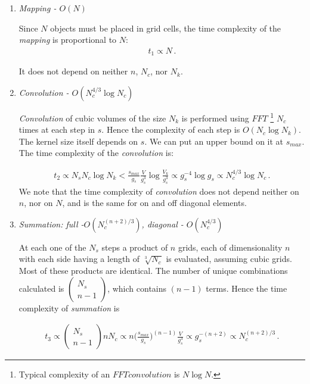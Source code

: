\documentclass{aa}
\begin{document}
\begin{enumerate}
\item \textit { Mapping - $O(N)$}

Since $N$ objects must be placed in grid cells, the time complexity of the \textit { mapping} is proportional to $N$:
\begin{align}
t_1 \propto N\, .
\label{eq:t1}
\end{align}

It does not depend on neither $n$, $N_c$, nor $N_k$. 

\item \textit { Convolution - $O(N_c^{4/3} \log N_c)$} 

\textit { Convolution} of cubic volumes of the size $N_k$ is performed  using $FFT$ \footnote{Typical complexity of an $FFT convolution$ is $N\log N$.} $N_c$ times at each step in $s$. Hence the complexity of each step is $O(N_c\log N_k)$.  The kernel size itself depends on $s$. We can put an upper bound on it at $s_{max}$. The time complexity of the \textit{convolution} is:

\begin{align}
t_2 \propto N_s N_c \log N_{k} < \frac{s_{max}}{g_s} \frac{V}{g_s^3} \log \frac{V_k}{g_s^3} \propto g_s^{-4} \log g_s \propto N_c^{4/3} \log N_c\, .
\label{eq:t2}
\end{align}
%
We note that the time complexity of \textit{ convolution} does not depend neither on $n$, nor on $N$, and is the same for on and off diagonal elements. 
\item \textit { Summation: full -$O(N_c^{(n+2)/3} )$,  diagonal - $O(N_c^{4/3})$}

At each one of the $N_s$ steps a product of $n$ grids, each of dimensionality $n$ with each side having a length of $\sqrt[3]{N_c}$ is evaluated, assuming cubic grids. Most of these products are identical.  The number of unique combinations calculated is $\begin{pmatrix}N_s \\ n-1 \end {pmatrix}$, which contains $(n-1)$ terms. Hence the time complexity of \textit { summation} is

\begin{align}
t_3 \propto \begin{pmatrix}N_s \\ n-1 \end {pmatrix} n N_c \propto n \big(\frac{s_{max}}{g_s}\big)^{(n-1)} \frac{V}{g_s^3}  \propto g_s^{-(n+2)} \propto N_c^{(n+2)/3} \, .
\label{eq:t3}
\end{align}


\end{enumerate}
\end{document}
